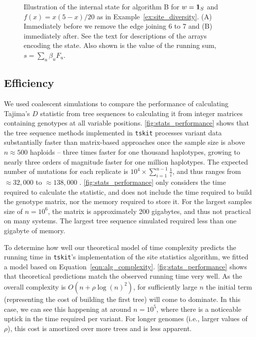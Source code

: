 \documentclass{article}
\newcommand{\tskit}{{\texttt{tskit}}}
\newcommand{\iw}{w} %
\begin{document}
\begin{figure}
    \caption{
    Illustration of the internal state for algorithm B for $\iw = \bone_S$ and
    $f(x) = x(5 - x) / 20$ as in Example~\ref{ex:site_diversity}. (A)
    Immediately before we remove the edge joining 6 to 7 and (B) immediately after.
    See the text for descriptions of the arrays encoding the state. Also shown
    is the value of the running sum, $s = \sum_u \beta_u F_u$.
    \label{fig:algorithm_example}}
\end{figure}

\subsection*{Efficiency}

We used coalescent simulations to compare the performance of calculating Tajima's \citeyearpar{Tajima1989-de} $D$
statistic from tree sequences to calculating it from integer matrices containing genotypes at all variable positions.
\autoref{fig:stats_performance} shows that the tree sequence methods implemented in \texttt{tskit} processes variant data
substantially faster than matrix-based approaches once the sample size is above $n \approx 500$ haploids --
three times faster for one thousand haplotypes,
growing to nearly three orders of magnitude faster for one million haplotypes.
The expected number of mutations for each replicate is $10^4 \times \sum_{i=1}^{n-1}\frac{1}{i}$, and thus ranges from
$\approx 32,000$ to $\approx 138,000$ \citep{Watterson1975-ej}.
\autoref{fig:stats_performance} only considers the time required to calculate the statistic,
and does not include the time required to build the genotype matrix, nor the memory required to store it.
For the largest samples size of $n=10^6$,
the matrix is approximately 200 gigabytes, and thus not practical on many systems.
The largest tree sequence simulated required less than one gigabyte of memory.

To determine how well our theoretical model of time complexity predicts the
running time in \tskit{}'s implementation of the site statistics algorithm,
we fitted a model based on Equation~\eqref{eqn:alg_complexity}.
\autoref{fig:stats_performance} shows that theoretical predictions match
the observed running time very well. As the overall complexity is
$O(n + \rho \log(n)^2)$, for sufficiently large $n$ the initial term
(representing the cost of building the first tree) will come to dominate.
In this case, we can see this happening at around $n = 10^5$, where there
is a noticeable uptick in the time required per variant. For
longer genomes (i.e., larger values of $\rho$), this cost is amortized over more trees
and is less apparent.
\end{document}

